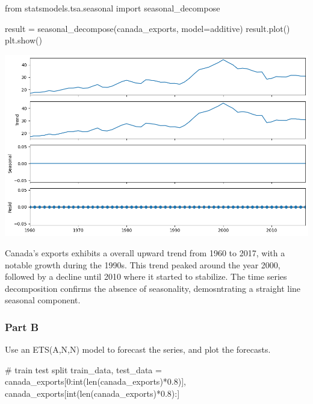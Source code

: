 \documentclass[
  11pt,
]{article}
\newenvironment{Shaded}{\begin{snugshade}}{\end{snugshade}}
\newcommand{\BuiltInTok}[1]{\textcolor[rgb]{0.00,0.23,0.31}{#1}}
\newcommand{\CommentTok}[1]{\textcolor[rgb]{0.37,0.37,0.37}{#1}}
\newcommand{\DecValTok}[1]{\textcolor[rgb]{0.68,0.00,0.00}{#1}}
\newcommand{\FloatTok}[1]{\textcolor[rgb]{0.68,0.00,0.00}{#1}}
\newcommand{\ImportTok}[1]{\textcolor[rgb]{0.00,0.46,0.62}{#1}}
\newcommand{\NormalTok}[1]{\textcolor[rgb]{0.00,0.23,0.31}{#1}}
\newcommand{\OperatorTok}[1]{\textcolor[rgb]{0.37,0.37,0.37}{#1}}
\newcommand{\StringTok}[1]{\textcolor[rgb]{0.13,0.47,0.30}{#1}}
\begin{document}
\begin{Shaded}
\begin{Highlighting}[]
\ImportTok{from}\NormalTok{ statsmodels.tsa.seasonal }\ImportTok{import}\NormalTok{ seasonal\_decompose}

\NormalTok{result }\OperatorTok{=}\NormalTok{ seasonal\_decompose(canada\_exports, model}\OperatorTok{=}\StringTok{\textquotesingle{}additive\textquotesingle{}}\NormalTok{)}
\NormalTok{result.plot()}
\NormalTok{plt.show()}
\end{Highlighting}
\end{Shaded}

\includegraphics{hw5_files/figure-pdf/cell-14-output-1.png}

Canada's exports exhibits a overall upward trend from 1960 to 2017, with
a notable growth during the 1990s. This trend peaked around the year
2000, followed by a decline until 2010 where it started to stabilize.
The time series decomposition confirms the absence of seasonality,
demosntrating a straight line seasonal component.

\subsubsection{Part B}\label{part-b-1}

Use an ETS(A,N,N) model to forecast the series, and plot the forecasts.

\begin{Shaded}
\begin{Highlighting}[]
\CommentTok{\# train test split }
\NormalTok{train\_data, test\_data }\OperatorTok{=}\NormalTok{ canada\_exports[}\DecValTok{0}\NormalTok{:}\BuiltInTok{int}\NormalTok{(}\BuiltInTok{len}\NormalTok{(canada\_exports)}\OperatorTok{*}\FloatTok{0.8}\NormalTok{)], canada\_exports[}\BuiltInTok{int}\NormalTok{(}\BuiltInTok{len}\NormalTok{(canada\_exports)}\OperatorTok{*}\FloatTok{0.8}\NormalTok{):]}
\end{Highlighting}
\end{Shaded}
\end{document}

